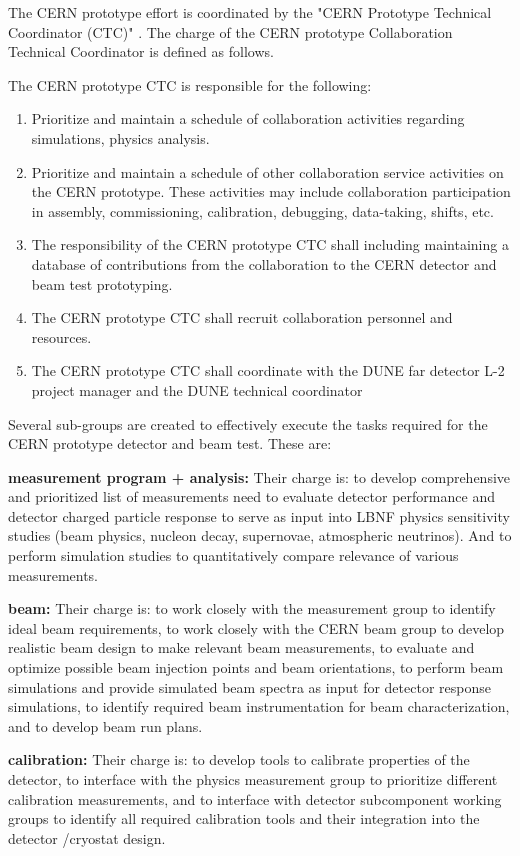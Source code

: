 The CERN prototype effort is coordinated by the "CERN Prototype Technical Coordinator (CTC)" \cite{LBNEorg}.
The charge of the CERN prototype Collaboration Technical Coordinator is defined as follows.

The CERN prototype CTC is responsible for the following:
\begin{enumerate}[i]
	\item Prioritize and maintain a schedule of collaboration activities regarding simulations, physics analysis. 
	\item Prioritize and maintain a schedule of other collaboration service activities on the CERN prototype.  These activities may include collaboration participation in assembly, commissioning, calibration, debugging, data-taking, shifts, etc. 
	\item The responsibility of the CERN prototype CTC shall including maintaining a database of contributions from the collaboration to the CERN detector and beam test prototyping.
	\item The CERN prototype CTC shall recruit collaboration personnel and resources.
	\item The CERN prototype CTC shall coordinate with the DUNE far detector L-2 project manager and the DUNE technical coordinator
\end{enumerate}

Several sub-groups are created to effectively execute the tasks required for the CERN prototype detector and beam test. These are: 

{\bf measurement program + analysis:}   Their charge is: to develop comprehensive and prioritized list of measurements need to evaluate detector performance and detector charged particle response to serve as input into LBNF physics sensitivity studies (beam physics, nucleon decay, supernovae, atmospheric neutrinos).  And to perform simulation studies to quantitatively compare relevance of various measurements.

{\bf beam:} Their charge is: to work closely with the measurement group to identify ideal beam requirements, to work closely with the CERN beam group to develop realistic beam design to make relevant beam measurements, to evaluate and optimize possible beam injection points and beam orientations, to perform beam simulations and provide simulated beam spectra as input for detector response simulations, to identify required beam instrumentation for beam characterization, and to develop beam run plans.

{\bf calibration:}  Their charge is:  to develop tools to calibrate properties of the detector, to interface with the physics measurement group to prioritize different calibration measurements, and to interface with detector subcomponent working groups to identify all required calibration tools and their integration into the detector /cryostat design.\\


